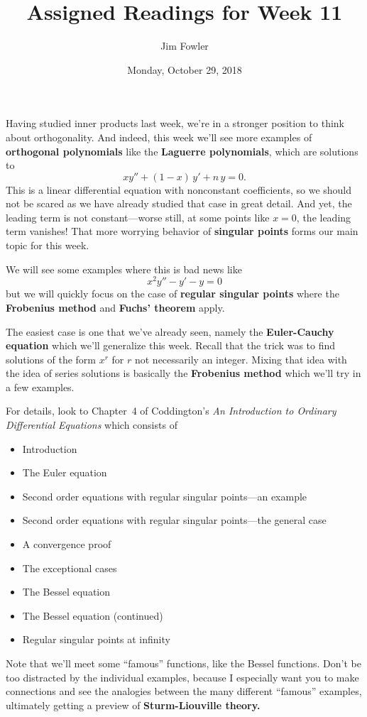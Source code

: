 \documentclass{homework}
\author{Jim Fowler}
\title{Assigned Readings for Week 11}
\date{Monday, October 29, 2018}
\begin{document}
\maketitle

Having studied inner products last week, we're in a stronger position
to think about orthogonality.  And indeed, this week we'll see more
examples of \textbf{orthogonal polynomials} like the \textbf{Laguerre
  polynomials}, which are solutions to
\[
  x y'' + (1-x) \, y' + n \, y = 0.
\]
This is a linear differential equation with nonconstant coefficients,
so we should not be scared as we have already studied that case in
great detail.  And yet, the leading term is not constant---worse
still, at some points like $x = 0$, the leading term vanishes!  That
more worrying behavior of \textbf{singular points} forms our main
topic for this week.

We will see some examples where this is bad news like
\[
  x^2 y'' - y' - y = 0
\]
but we will quickly focus on the case of \textbf{regular singular
  points} where the \textbf{Frobenius method} and \textbf{Fuchs'
  theorem} apply.

The easiest case is one that we've already seen, namely the
\textbf{Euler-Cauchy equation} which we'll generalize this week.
Recall that the trick was to find solutions of the form $x^r$ for $r$
not necessarily an integer.  Mixing that idea with the idea of series
solutions is basically the \textbf{Frobenius method} which we'll try
in a few examples.

For details, look to Chapter~4 of Coddington's \textit{An Introduction
  to Ordinary Differential Equations} which consists of
\begin{itemize}
\item {} Introduction
\item {} The Euler equation
\item {} Second order equations with regular singular points---an example
\item {} Second order equations with regular singular points---the general case
\item {} A convergence proof
\item {} The exceptional cases
\item {} The Bessel equation
\item {} The Bessel equation (continued)
\item {} Regular singular points at infinity
\end{itemize}
Note that we'll meet some ``famous'' functions, like the Bessel
functions.  Don't be too distracted by the individual examples,
because I especially want you to make connections and see the
analogies between the many different ``famous'' examples, ultimately
getting a preview of \textbf{Sturm-Liouville theory.}
\end{document}
